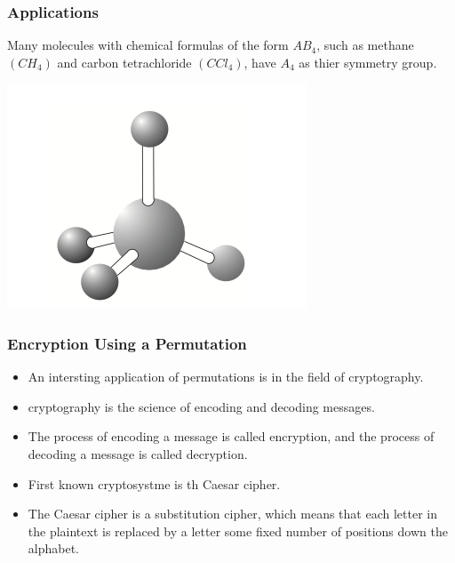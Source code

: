 \documentclass{beamer}
\begin{document}
\begin{frame}
    \frametitle{Applications}

    Many molecules with chemical formulas of the form \(AB_4\), such as methane \((CH_4)\) and carbon tetrachloride \((CCl_4)\), have \(A_4\) as thier symmetry group. 

    \includegraphics[scale=0.5]{Figures/fig_4.png}

\end{frame}

\begin{frame}
    \frametitle{Encryption Using a Permutation}

    \begin{itemize}
        \item An intersting application of permutations is in the field of cryptography.\pause
        \item cryptography is the science of encoding and decoding messages. \pause
        \item The process of encoding a message is called encryption, and the process of decoding a message is called decryption. \pause
        \item First known cryptosystme is th Caesar cipher. \pause
        \item The Caesar cipher is a substitution cipher, which means that each letter in the plaintext is replaced by a letter some fixed number of positions down the alphabet. 
    \end{itemize}

\end{frame}
\end{document}
